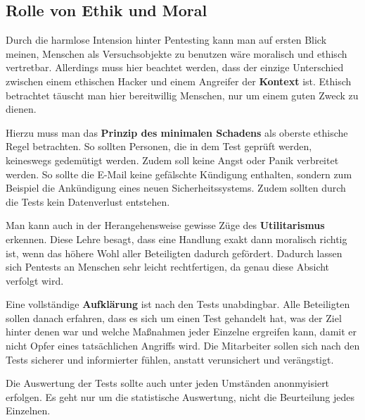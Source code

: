 \documentclass[12pt, a4paper, oneside]{scrartcl}
\begin{document}
\subsection{Rolle von Ethik und Moral}
Durch die harmlose Intension hinter Pentesting kann man auf ersten Blick meinen, Menschen als Versuchsobjekte
zu benutzen wäre moralisch und ethisch vertretbar. Allerdings muss hier beachtet werden, dass der 
einzige Unterschied zwischen einem ethischen Hacker und einem Angreifer der \textbf{Kontext} ist.
Ethisch betrachtet täuscht man hier bereitwillig Menschen, nur um einem guten Zweck zu dienen. 
\par
Hierzu muss man das \textbf{Prinzip des minimalen Schadens} als oberste ethische Regel betrachten. So sollten
Personen, die in dem Test geprüft werden, keineswegs gedemütigt werden. Zudem soll keine Angst oder Panik
verbreitet werden. So sollte die E-Mail keine gefälschte Kündigung enthalten, sondern zum Beispiel die 
Ankündigung eines neuen Sicherheitssystems. Zudem sollten durch die Tests kein Datenverlust entstehen.
\par
Man kann auch in der Herangehensweise gewisse Züge des \textbf{Utilitarismus} erkennen. Diese Lehre besagt,
dass eine Handlung exakt dann moralisch richtig ist, wenn das höhere Wohl aller Beteiligten dadurch gefördert.
Dadurch lassen sich Pentests an Menschen sehr leicht rechtfertigen, da genau diese Absicht verfolgt wird.
\par
Eine vollständige \textbf{Aufklärung} ist nach den Tests unabdingbar. Alle Beteiligten sollen danach
erfahren, dass es sich um einen Test gehandelt hat, was der Ziel hinter denen war und welche Maßnahmen
jeder Einzelne ergreifen kann, damit er nicht Opfer eines tatsächlichen Angriffs wird.
Die Mitarbeiter sollen sich nach den Tests sicherer und informierter fühlen, anstatt verunsichert und 
verängstigt.
\par
Die Auswertung der Tests sollte auch unter jeden Umständen anonmyisiert erfolgen. Es geht nur um
die statistische Auswertung, nicht die Beurteilung jedes Einzelnen. 

\end{document}
